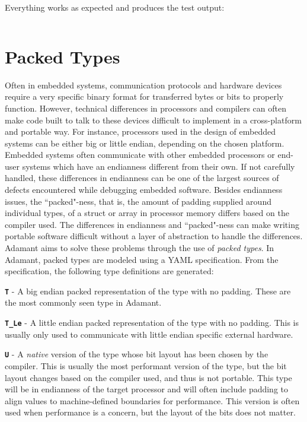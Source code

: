 Everything works as expected and produces the test output:

\vspace{5mm} %
\inputminted{text}{ ../example_architecture/oo_package/test/output.txt}
\vspace{5mm} %

\newpage
\section{Packed Types} \label{Packed Types}

Often in embedded systems, communication protocols and hardware devices require a very specific binary format for transferred bytes or bits to properly function. However, technical differences in processors and compilers can often make code built to talk to these devices difficult to implement in a cross-platform and portable way. For instance, processors used in the design of embedded systems can be either big or little endian, depending on the chosen platform. Embedded systems often communicate with other embedded processors or end-user systems which have an endianness different from their own. If not carefully handled, these differences in endianness can be one of the largest sources of defects encountered while debugging embedded software. Besides endianness issues, the ``packed"-ness, that is, the amount of padding supplied around individual types, of a struct or array in processor memory differs based on the compiler used. The differences in endianness and ``packed"-ness can make writing portable software difficult without a layer of abstraction to handle the differences. \\

Adamant aims to solve these problems through the use of \textit{packed types}.  In Adamant, packed types are modeled using a YAML specification. From the specification, the following type definitions are generated:

\vspace{5mm} %
\begin{spaceditemize}
  \item \textbf{\texttt{T}} - A big endian packed representation of the type with no padding. These are the most commonly seen type in Adamant.
  \item \textbf{\texttt{T\_Le}} - A little endian packed representation of the type with no padding. This is usually only used to communicate with little endian specific external hardware.
  \item \textbf{\texttt{U}} - A \textit{native} version of the type whose bit layout has been chosen by the compiler. This is usually the most performant version of the type, but the bit layout changes based on the compiler used, and thus is not portable. This type will be in endianness of the target processor and will often include padding to align values to machine-defined boundaries for performance. This version is often used when performance is a concern, but the layout of the bits does not matter.
\end{spaceditemize}
\vspace{5mm} %

